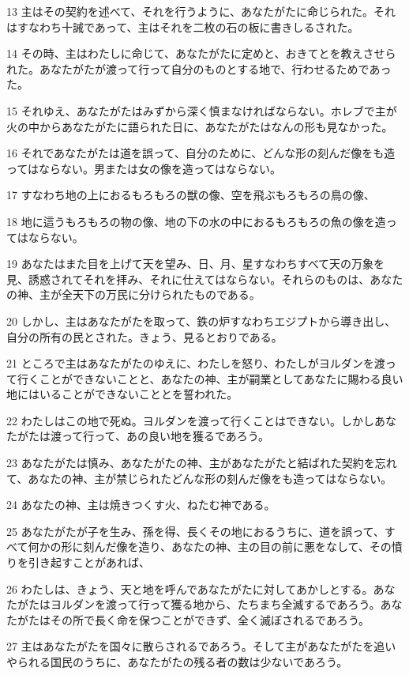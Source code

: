 \par 13 主はその契約を述べて、それを行うように、あなたがたに命じられた。それはすなわち十誡であって、主はそれを二枚の石の板に書きしるされた。
\par 14 その時、主はわたしに命じて、あなたがたに定めと、おきてとを教えさせられた。あなたがたが渡って行って自分のものとする地で、行わせるためであった。
\par 15 それゆえ、あなたがたはみずから深く慎まなければならない。ホレブで主が火の中からあなたがたに語られた日に、あなたがたはなんの形も見なかった。
\par 16 それであなたがたは道を誤って、自分のために、どんな形の刻んだ像をも造ってはならない。男または女の像を造ってはならない。
\par 17 すなわち地の上におるもろもろの獣の像、空を飛ぶもろもろの鳥の像、
\par 18 地に這うもろもろの物の像、地の下の水の中におるもろもろの魚の像を造ってはならない。
\par 19 あなたはまた目を上げて天を望み、日、月、星すなわちすべて天の万象を見、誘惑されてそれを拝み、それに仕えてはならない。それらのものは、あなたの神、主が全天下の万民に分けられたものである。
\par 20 しかし、主はあなたがたを取って、鉄の炉すなわちエジプトから導き出し、自分の所有の民とされた。きょう、見るとおりである。
\par 21 ところで主はあなたがたのゆえに、わたしを怒り、わたしがヨルダンを渡って行くことができないことと、あなたの神、主が嗣業としてあなたに賜わる良い地にはいることができないこととを誓われた。
\par 22 わたしはこの地で死ぬ。ヨルダンを渡って行くことはできない。しかしあなたがたは渡って行って、あの良い地を獲るであろう。
\par 23 あなたがたは慎み、あなたがたの神、主があなたがたと結ばれた契約を忘れて、あなたの神、主が禁じられたどんな形の刻んだ像をも造ってはならない。
\par 24 あなたの神、主は焼きつくす火、ねたむ神である。
\par 25 あなたがたが子を生み、孫を得、長くその地におるうちに、道を誤って、すべて何かの形に刻んだ像を造り、あなたの神、主の目の前に悪をなして、その憤りを引き起すことがあれば、
\par 26 わたしは、きょう、天と地を呼んであなたがたに対してあかしとする。あなたがたはヨルダンを渡って行って獲る地から、たちまち全滅するであろう。あなたがたはその所で長く命を保つことができず、全く滅ぼされるであろう。
\par 27 主はあなたがたを国々に散らされるであろう。そして主があなたがたを追いやられる国民のうちに、あなたがたの残る者の数は少ないであろう。
